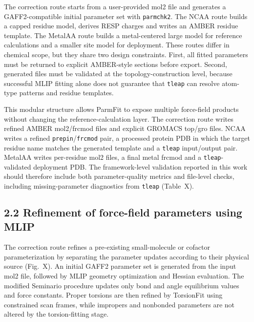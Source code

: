 The correction route starts from a user-provided mol2 file and generates a GAFF2-compatible initial parameter set with \texttt{parmchk2}. The NCAA route builds a capped residue model, derives RESP charges and writes an AMBER residue template. The MetalAA route builds a metal-centered large model for reference calculations and a smaller site model for deployment. These routes differ in chemical scope, but they share two design constraints. First, all fitted parameters must be returned to explicit AMBER-style sections before export. Second, generated files must be validated at the topology-construction level, because successful MLIP fitting alone does not guarantee that \texttt{tleap} can resolve atom-type patterns and residue templates.

This modular structure allows ParmFit to expose multiple force-field products without changing the reference-calculation layer. The correction route writes refined AMBER mol2/frcmod files and explicit GROMACS top/gro files. NCAA writes a refined \texttt{prepin}/\texttt{frcmod} pair, a processed protein PDB in which the target residue name matches the generated template and a \texttt{tleap} input/output pair. MetalAA writes per-residue mol2 files, a final metal frcmod and a \texttt{tleap}-validated deployment PDB. The framework-level validation reported in this work should therefore include both parameter-quality metrics and file-level checks, including missing-parameter diagnostics from \texttt{tleap} (Table~X).

\subsection{2.2 Refinement of force-field parameters using MLIP}

The correction route refines a pre-existing small-molecule or cofactor parameterization by separating the parameter updates according to their physical source (Fig.~X). An initial GAFF2 parameter set is generated from the input mol2 file, followed by MLIP geometry optimization and Hessian evaluation. The modified Seminario procedure updates only bond and angle equilibrium values and force constants. Proper torsions are then refined by TorsionFit using constrained scan frames, while impropers and nonbonded parameters are not altered by the torsion-fitting stage.

